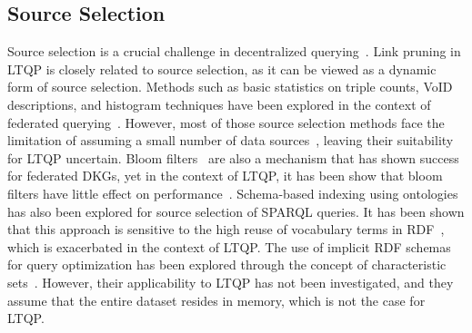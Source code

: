 \subsection{Source Selection}
Source selection is a crucial challenge in decentralized querying~\cite{hose2012towards, Harth2010}. 
Link pruning in LTQP is closely related to source selection, as it can be viewed as a dynamic form of source selection.
Methods such as basic statistics on triple counts, VoID descriptions, and histogram techniques have been explored in the context of federated querying~\cite{hose2012towards, Harth2010, Montoya2017}.
However, most of those source selection methods face the limitation of assuming a small number of data sources~\cite{Harth2010}, leaving their suitability for LTQP uncertain.
Bloom filters~\cite{dia2018fast} are also a mechanism that has shown success for federated DKGs, yet in the context of LTQP, it has been show that bloom filters have little effect on performance~\cite{Hanski2024}.
Schema-based indexing using ontologies~\cite{Stuckenschmidt2004} has also been explored for source selection of SPARQL queries.
It has been shown that this approach is sensitive to the high reuse of vocabulary terms in RDF~\cite{Harth2010}, which is exacerbated in the context of LTQP.
The use of implicit RDF schemas for query optimization has been explored through the concept of characteristic sets~\cite{Neumann2011CharacteristicSA, Meimaris2017ExtendedCS, Montoya2017}. 
However, their applicability to LTQP has not been investigated, and they assume that the entire dataset resides in memory, which is not the case for LTQP.
